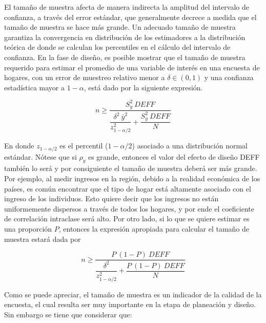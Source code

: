 \documentclass[
  12pt,
  spanish,
]{book}
\begin{document}
El tamaño de muestra afecta de manera indirecta la amplitud del intervalo de confianza, a través del error estándar, que generalmente decrece a medida que el tamaño de muestra se hace más grande. Un adecuado tamaño de muestra garantiza la convergencia en distribución de los estimadores a la distribución teórica de donde se calculan los percentiles en el cálculo del intervalo de confianza. En la fase de diseño, es posible mostrar que el tamaño de muestra requerido para estimar el promedio de una variable de interés en una encuesta de hogares, con un error de muestreo relativo menor a \(\delta \in (0,1)\) y una confianza estadística mayor a \(1-\alpha\), está dado por la siguiente expresión.

\[ 
n \geq \dfrac{S^2_{y}\ DEFF}{\dfrac{\delta^2 \  \bar{y}^2}{z_{1-\alpha/2}^2}+\dfrac{S^2_{y}\ DEFF}{N}}
\]

En donde \(z_{1-\alpha/2}\) es el percentil (\(1- \alpha/2\)) asociado a una distribución normal estándar. Nótese que si \(\rho_y\) es grande, entonces el valor del efecto de diseño DEFF también lo será y por consiguiente el tamaño de muestra deberá ser más grande. Por ejemplo, al medir ingresos en la región, debido a la realidad económica de los países, es común encontrar que el tipo de hogar está altamente asociado con el ingreso de los individuos. Esto quiere decir que los ingresos no están uniformemente dispersos a través de todos los hogares, y por ende el coeficiente de correlación intraclase será alto. Por otro lado, si lo que se quiere estimar es una proporción \(P\), entonces la expresión apropiada para calcular el tamaño de muestra estará dada por

\[ 
n \geq \dfrac{P\ (1-P)\ DEFF}{\dfrac{\delta^2}{z_{1-\alpha/2}^2 }+\dfrac{P\ (1-P) \ DEFF}{N}}
\]

Como se puede apreciar, el tamaño de muestra es un indicador de la calidad de la encuesta, el cual resulta ser muy importante en la etapa de planeación y diseño. Sin embargo se tiene que considerar que:
\end{document}
